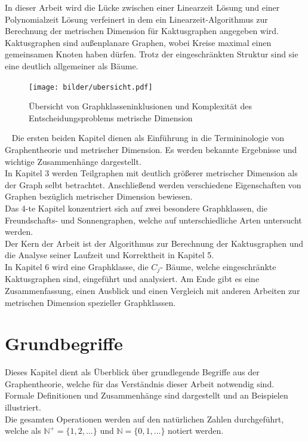 In dieser Arbeit wird die Lücke zwischen einer Linearzeit Lösung und einer Polynomialzeit Lösung verfeinert in dem ein Linearzeit-Algorithmus zur Berechnung der metrischen Dimension für Kaktusgraphen angegeben wird. Kaktusgraphen sind außenplanare Graphen, wobei Kreise maximal einen gemeinsamen Knoten haben dürfen. Trotz der eingeschränkten Struktur sind sie eine deutlich allgemeiner als Bäume.
\vspace{-3mm}
\newline
\begin{figure}[h]
\centering
\texttt{[image: bilder/ubersicht.pdf]}
\caption{Übersicht von Graphklasseninklusionen und Komplexität des Entscheidungsproblems metrische Dimension}
\end{figure}
~\linebreak
Die ersten beiden Kapitel dienen als Einführung in die Termininologie von Graphentheorie und metrischer Dimension. Es werden bekannte Ergebnisse und wichtige Zusammenhänge dargestellt.\\In Kapitel 3 werden Teilgraphen mit deutlich größerer metrischer Dimension als der Graph selbt betrachtet. Anschließend werden verschiedene Eigenschaften von Graphen bezüglich metrischer Dimension bewiesen.\\ 
Das 4-te Kapitel konzentriert sich auf zwei besondere Graphklassen, die Freundschafts- und Sonnengraphen, welche auf unterschiedliche Arten untersucht werden.\\Der Kern der Arbeit ist der Algorithmus zur Berechnung der Kaktusgraphen und die Analyse seiner Laufzeit und Korrektheit in Kapitel 5.\\In Kapitel 6 wird eine Graphklasse, die $C_j$- Bäume, welche eingeschränkte Kaktusgraphen sind, eingeführt und analysiert. Am Ende gibt es eine Zusammenfassung, einen Ausblick und einen Vergleich mit anderen Arbeiten zur metrischen Dimension spezieller Graphklassen.
\chapter{Grundbegriffe}
\vspace{-4mm}
Dieses Kapitel dient als Überblick über grundlegende Begriffe aus der Graphentheorie, welche für das Verständnis dieser Arbeit notwendig sind. Formale Definitionen und Zusammenhänge sind dargestellt und an Beispielen illustriert.%
\\
Die gesamten Operationen werden auf den natürlichen Zahlen durchgeführt, welche als $\mathbb{N}^+=\{1,2,\ldots\}$ und $\mathbb{N}=\{0,1,\ldots\}$ notiert werden.
\vspace{-2mm}
